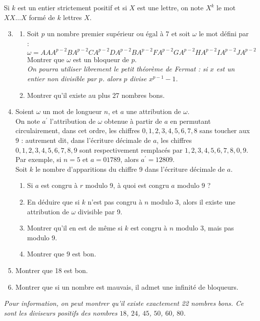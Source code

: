 \documentclass[landscape,twocolumn,leqno,a4paper,10pt]{report} %
\newcommand\n{\noindent}
\begin{document}
\n Si $k$ est un entier strictement positif et si $X$ est une lettre, on note $X^{k}$ le mot $X X \ldots X$ formé de $k$ lettres $X$.

\begin{enumerate}\setcounter{enumi}{2}
	\item \begin{enumerate}
		\item Soit $p$ un nombre premier supérieur ou égal à 7 et soit $\omega$ le mot défini par :
		$$\omega=A A A^{p-2} B A^{p-2} C A^{p-2} D A^{p-2} B A^{p-2} F A^{p-2} G A^{p-2} H A^{p-2} I A^{p-2} J A^{p-2}$$
		Montrer que $\omega$ est un bloqueur de $p$.\\
		\textit{On pourra utiliser librement le petit théorème de Fermat : si $x$ est un entier non divisible par $p$. alors $p$ divise $x^{p-1}-1$.}
		\item Montrer qu'il existe au plus 27 nombres bons.
	\end{enumerate}
	\item Soient $\omega$ un mot de longueur $n$, et $a$ une attribution de $\omega$.\\
	On note $a^{\prime}$ l'attribution de $\omega$ obtenue à partir de $a$ en permutant circulairement, dans cet ordre, les chiffres $0,1,2,3,4,5,6,7,8$ sans toucher aux 9 : autrement dit, dans l'écriture décimale de $a$, les chiffres $0,1,2,3,4,5,6,7,8,9$ sont respectivement remplacés par $1,2,3,4,5,6,7,8,0,9$. Par exemple, si $n=5$ et $a=01789$, alors $a^{\prime}=12809$.\\
	Soit $k$ le nombre d'apparitions du chiffre 9 dans l'écriture décimale de $a$.
	\begin{enumerate}
		\item Si $a$ est congru à $r$ modulo 9, à quoi est congru $a$ modulo $9$ ?
		\item En déduire que si $k$ n'est pas congru à $n$ modulo 3, alors il existe une attribution de $\omega$ divisible par 9.
		\item Montrer qu'il en est de même si $k$ est congru à $n$ modulo 3, mais pas modulo 9.
		\item Montrer que 9 est bon.
	\end{enumerate}
	\item Montrer que 18 est bon.
	\item Montrer que si un nombre est mauvais, il admet une infinité de bloqueurs.
\end{enumerate}

\n \textit{Pour information, on peut montrer qu'il existe exactement 22 nombres bons. Ce sont les diviseurs positifs des nombres $18$, $24$, $45$, $50$, $60$, $80$.}
\end{document}
